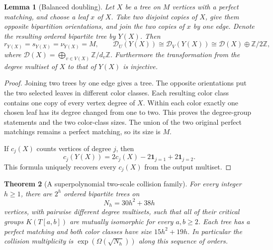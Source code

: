 \documentclass[11pt,a4paper]{article}
\newtheorem{theorem}{Theorem}[section]
\newtheorem{lemma}[theorem]{Lemma}
\theoremstyle{definition}\newtheorem{definition}[theorem]{Definition}
\theoremstyle{remark}\newtheorem{remark}[theorem]{Remark}
\newcommand{\Z}{\mathbb Z}\newcommand{\Q}{\mathbb Q}\newcommand{\F}{\mathbb F}
\numberwithin{equation}{section}
\begin{document}
\begin{lemma}[Balanced doubling]
\label{ext-keio-doubling}
Let $X$ be a tree on $M$ vertices with a perfect matching, and choose a leaf
$x$ of $X$.  Take two disjoint copies of $X$, give them opposite bipartition
orientations, and join the two copies of $x$ by one edge.  Denote the resulting
ordered bipartite tree by $Y(X)$.  Then
\[
 r_{Y(X)}=s_{Y(X)}=\nu_{Y(X)}=M,
 \qquad
 \mathcal D_U(Y(X))\cong\mathcal D_V(Y(X))
       \cong\mathcal D(X)\oplus\Z/2\Z,
\]
where $\mathcal D(X)=\bigoplus_{v\in V(X)}\Z/d_v\Z$.
Furthermore the transformation from the degree multiset of $X$ to that of
$Y(X)$ is injective.
\end{lemma}

\begin{proof}
Joining two trees by one edge gives a tree.  The opposite orientations put the
two selected leaves in different color classes.  Each resulting color class
contains one copy of every vertex degree of $X$.  Within each color exactly
one chosen leaf has its degree changed from one to two.  This proves the
degree-group statements and the two color-class sizes.  The union of the two
original perfect matchings remains a perfect matching, so its size is $M$.

If $c_j(X)$ counts vertices of degree $j$, then
\[
 c_j(Y(X))=2c_j(X)-2\mathbf1_{j=1}+2\mathbf1_{j=2}.
\]
This formula uniquely recovers every $c_j(X)$ from the output multiset.
\end{proof}

\begin{theorem}[A superpolynomial two-scale collision family]
\label{ext-keio-collisions}
For every integer $h\geq1$, there are $2^h$ ordered bipartite trees on
\[
 N_h=30h^2+38h
\]
vertices, with pairwise different degree multisets, such that all of their
critical groups $K(T[a,b])$ are mutually isomorphic for every $a,b\geq2$.
Each tree has a perfect matching and both color classes have size
$15h^2+19h$.  In particular the collision multiplicity is
$\exp(\Omega(\sqrt{N_h}))$ along this sequence of orders.
\end{theorem}
\end{document}
